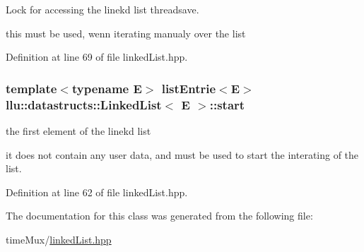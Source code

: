 Lock for accessing the linekd list threadsave. 

this must be used, wenn iterating manualy over the list 

Definition at line 69 of file linked\+List.\+hpp.

\hypertarget{classllu_1_1datastructs_1_1_linked_list_a2d5511009cd4b6579b8978af4f23c148}{
\subsubsection[{start}]{\setlength{\rightskip}{0pt plus 5cm}template$<$typename E$>$ {\bf list\+Entrie}$<$E$>$ {\bf llu\+::datastructs\+::\+Linked\+List}$<$ E $>$\+::start}}\label{classllu_1_1datastructs_1_1_linked_list_a2d5511009cd4b6579b8978af4f23c148}


the first element of the linekd list 

it does not contain any user data, and must be used to start the interating of the list. 

Definition at line 62 of file linked\+List.\+hpp.



The documentation for this class was generated from the following file\+:\begin{DoxyCompactItemize}
\item 
time\+Mux/\hyperlink{linked_list_8hpp}{linked\+List.\+hpp}\end{DoxyCompactItemize}
